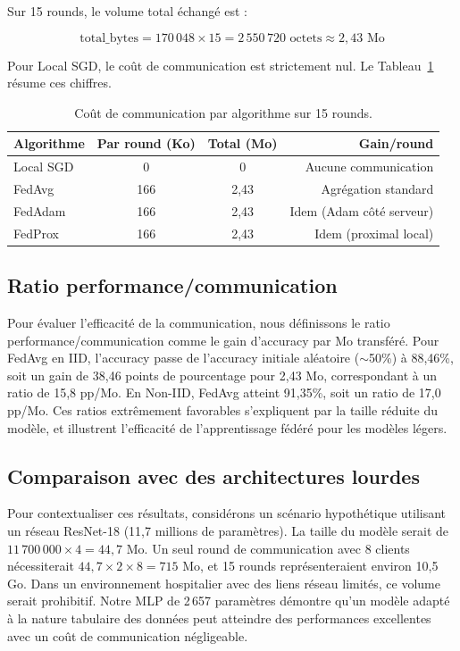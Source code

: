 \documentclass[12pt,a4paper]{report}
\begin{document}
Sur 15 rounds, le volume total \'{e}chang\'{e} est :

\begin{equation}
\text{total\_bytes} = 170\,048 \times 15 = 2\,550\,720 \text{ octets} \approx 2,43 \text{ Mo}
\label{eq:total_bytes}
\end{equation}

Pour Local SGD, le co\^{u}t de communication est strictement nul. Le Tableau~\ref{tab:comm_cost} r\'{e}sume ces chiffres.

\begin{table}[H]
\centering
\caption{Co\^{u}t de communication par algorithme sur 15 rounds.}
\label{tab:comm_cost}
\begin{tabular}{lccr}
\toprule
\textbf{Algorithme} & \textbf{Par round (Ko)} & \textbf{Total (Mo)} & \textbf{Gain/round} \\
\midrule
Local SGD & 0 & 0 & Aucune communication \\
FedAvg    & 166 & 2,43 & Agr\'{e}gation standard \\
FedAdam   & 166 & 2,43 & Idem (Adam c\^{o}t\'{e} serveur) \\
FedProx   & 166 & 2,43 & Idem (proximal local) \\
\bottomrule
\end{tabular}
\end{table}

\subsection{Ratio performance/communication}

Pour \'{e}valuer l'efficacit\'{e} de la communication, nous d\'{e}finissons le ratio performance/communication comme le gain d'accuracy par Mo transf\'{e}r\'{e}. Pour FedAvg en IID, l'accuracy passe de l'accuracy initiale al\'{e}atoire ($\sim$50\%) \`{a} 88,46\%, soit un gain de 38,46 points de pourcentage pour 2,43 Mo, correspondant \`{a} un ratio de 15,8 pp/Mo. En Non-IID, FedAvg atteint 91,35\%, soit un ratio de 17,0 pp/Mo. Ces ratios extr\^{e}mement favorables s'expliquent par la taille r\'{e}duite du mod\`{e}le, et illustrent l'efficacit\'{e} de l'apprentissage f\'{e}d\'{e}r\'{e} pour les mod\`{e}les l\'{e}gers.

\subsection{Comparaison avec des architectures lourdes}

Pour contextualiser ces r\'{e}sultats, consid\'{e}rons un sc\'{e}nario hypoth\'{e}tique utilisant un r\'{e}seau ResNet-18 (11,7 millions de param\`{e}tres). La taille du mod\`{e}le serait de $11\,700\,000 \times 4 = 44,7$ Mo. Un seul round de communication avec 8 clients n\'{e}cessiterait $44,7 \times 2 \times 8 = 715$ Mo, et 15 rounds repr\'{e}senteraient environ 10,5 Go. Dans un environnement hospitalier avec des liens r\'{e}seau limit\'{e}s, ce volume serait prohibitif. Notre MLP de 2\,657 param\`{e}tres d\'{e}montre qu'un mod\`{e}le adapt\'{e} \`{a} la nature tabulaire des donn\'{e}es peut atteindre des performances excellentes avec un co\^{u}t de communication n\'{e}gligeable.
\end{document}
